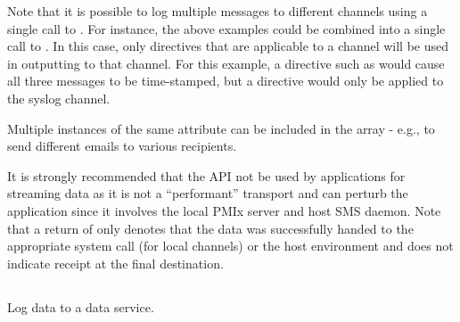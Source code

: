 Note that it is possible to log multiple messages to different channels using a single call to . For instance, the above examples could be combined into a single call to . In this case, only directives that are applicable to a channel will be used in outputting to that channel. For this example, a directive such as  would cause all three messages to be time-stamped, but a  directive would only be applied to the syslog channel.

Multiple instances of the same attribute can be included in the  array - e.g., to send different emails to various recipients.

\adviceuserstart
It is strongly recommended that the  API not be used by applications for streaming data as it is not a ``performant'' transport and can perturb the application since it involves the local \ac{PMIx} server and host \ac{SMS} daemon. Note that a return of  only denotes that the data was successfully handed to the appropriate system call (for local channels) or the host environment and does not indicate receipt at the final destination.
\adviceuserend

\subsection{}

\summary

Log data to a data service.

\format


\begin{arglist}
\end{arglist}

